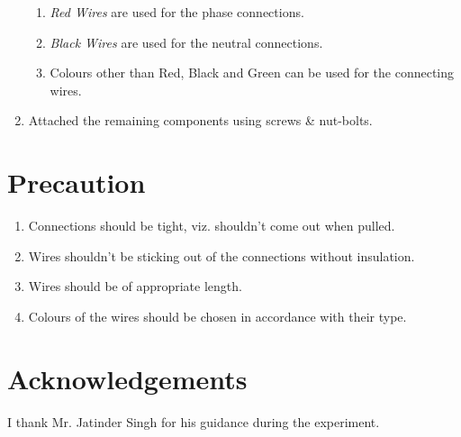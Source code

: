 \begin{enumerate}
			\begin{enumerate}
				\item \emph{Red Wires} are used for the phase connections.
				\item \emph{Black Wires} are used for the neutral connections.
				\item Colours other than Red, Black and Green can be used for the connecting wires.
			\end{enumerate}	
		\item Attached the remaining components using screws \& nut-bolts.			
	\end{enumerate}
\section{Precaution}
	\begin{enumerate}
		\item Connections should be tight, viz. shouldn't come out when pulled.
		\item Wires shouldn't be sticking out of the connections without insulation.
		\item Wires should be of appropriate length.
		\item Colours of the wires should be chosen in accordance with their type.
	\end{enumerate}	
\section{Acknowledgements}
I thank Mr. Jatinder Singh for his guidance during the experiment.